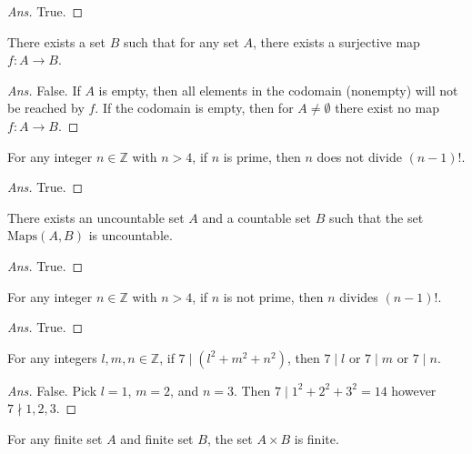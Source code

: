 \documentclass[12pt]{article}
\newenvironment{problem}[2][Problem]{\begin{trivlist}
\item[\hskip \labelsep {\bfseries #1}\hskip \labelsep {\bfseries #2.}]}{\end{trivlist}}
\begin{document}
\begin{proof}[Ans]
True.
\end{proof}

\begin{problem}{39}
There exists a set $B$ such that for any set $A$, there exists a surjective map $f : A \rightarrow B$.
\end{problem}

\begin{proof}[Ans]
False. If $A$ is empty, then all elements in the codomain (nonempty) will not be reached by $f$. If the codomain is empty, then for $A \neq \emptyset$ there exist no map $f : A \rightarrow B$.
\end{proof}

\begin{problem}{40}
For any integer $n \in \mathbb{Z}$ with $n > 4$, if $n$ is prime, then $n$ does not divide $(n-1)!$.
\end{problem}

\begin{proof}[Ans]
True.
\end{proof}

\begin{problem}{41}
There exists an uncountable set $A$ and a countable set $B$ such that the set $\text{Maps}(A, B)$ is uncountable. 
\end{problem}

\begin{proof}[Ans]
True.
\end{proof}

\begin{problem}{42}
For any integer $n \in \mathbb{Z}$ with $ n>4$, if $n$ is not prime, then $n$ divides $(n-1)!$.
\end{problem}

\begin{proof}[Ans]
True.
\end{proof}

\begin{problem}{43}
For any integers $l, m, n \in \mathbb{Z}$, if $7 \mid (l^2 + m^2 + n^2)$, then $7 \mid l$ or $7 \mid m$ or $7 \mid n$.
\end{problem}

\begin{proof}[Ans]
False. Pick $l = 1$, $m = 2$, and $n = 3$. Then $7 \mid 1^2 + 2^2 + 3^2 = 14$ however $7 \nmid 1, 2, 3$.
\end{proof}

\begin{problem}{44}
For any finite set $A$ and finite set $B$, the set $A \times B$ is finite.
\end{problem}
\end{document}
